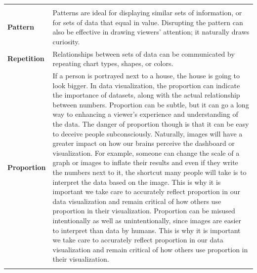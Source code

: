 \documentclass[]{book}
\begin{document}
\begin{longtable}[]{@{}ll@{}}
\begin{minipage}[t]{0.79\columnwidth}
\end{minipage}\tabularnewline
\begin{minipage}[t]{0.15\columnwidth}\raggedright
\textbf{Pattern}\strut
\end{minipage} & \begin{minipage}[t]{0.79\columnwidth}\raggedright
Patterns are ideal for displaying similar sets of information, or for sets of data that equal in value. Disrupting the pattern can also be effective in drawing viewers' attention; it naturally draws curiosity.\strut
\end{minipage}\tabularnewline
\begin{minipage}[t]{0.15\columnwidth}\raggedright
\textbf{Repetition}\strut
\end{minipage} & \begin{minipage}[t]{0.79\columnwidth}\raggedright
Relationships between sets of data can be communicated by repeating chart types, shapes, or colors.\strut
\end{minipage}\tabularnewline
\begin{minipage}[t]{0.15\columnwidth}\raggedright
\textbf{Proportion}\strut
\end{minipage} & \begin{minipage}[t]{0.79\columnwidth}\raggedright
If a person is portrayed next to a house, the house is going to look bigger. In data visualization, the proportion can indicate the importance of datasets, along with the actual relationship between numbers. Proportion can be subtle, but it can go a long way to enhancing a viewer's experience and understanding of the data. The danger of proportion though is that it can be easy to deceive people subconsciously. Naturally, images will have a greater impact on how our brains perceive the dashboard or visualization. For example, someone can change the scale of a graph or images to inflate their results and even if they write the numbers next to it, the shortcut many people will take is to interpret the data based on the image. This is why it is important we take care to accurately reflect proportion in our data visualization and remain critical of how others use proportion in their visualization. Proportion can be misused intentionally as well as unintentionally, since images are easier to interpret than data by humans. This is why it is important we take care to accurately reflect proportion in our data visualization and remain critical of how others use proportion in their visualization.\strut
\end{minipage}\tabularnewline
\begin{minipage}[t]{0.15\columnwidth}\raggedright

\end{minipage}
\end{longtable}
\end{document}
